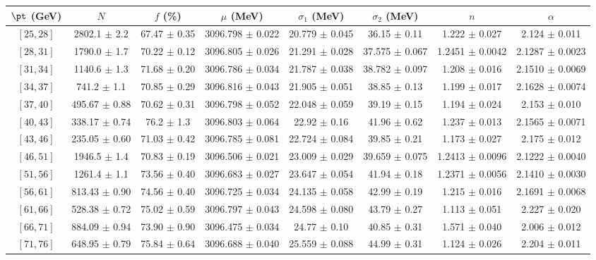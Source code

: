 \begin{tabular}{c||c|c|c|c|c|c|c}
$\pt$ (GeV) & $N$ & $f$ (\%) & $\mu$ (MeV) & $\sigma_1$ (MeV) & $\sigma_2$ (MeV) & $n$ & $\alpha$ \\
\hline
$[25, 28]$ & 2802.1 $\pm$ 2.2 & 67.47 $\pm$ 0.35 & 3096.798 $\pm$ 0.022 & 20.779 $\pm$ 0.045 & 36.15 $\pm$ 0.11 & 1.222 $\pm$ 0.027 & 2.124 $\pm$ 0.011\\
$[28, 31]$ & 1790.0 $\pm$ 1.7 & 70.22 $\pm$ 0.12 & 3096.805 $\pm$ 0.026 & 21.291 $\pm$ 0.028 & 37.575 $\pm$ 0.067 & 1.2451 $\pm$ 0.0042 & 2.1287 $\pm$ 0.0023\\
$[31, 34]$ & 1140.6 $\pm$ 1.3 & 71.68 $\pm$ 0.20 & 3096.786 $\pm$ 0.034 & 21.787 $\pm$ 0.038 & 38.782 $\pm$ 0.097 & 1.208 $\pm$ 0.016 & 2.1510 $\pm$ 0.0069\\
$[34, 37]$ & 741.2 $\pm$ 1.1 & 70.85 $\pm$ 0.29 & 3096.816 $\pm$ 0.043 & 21.905 $\pm$ 0.051 & 38.85 $\pm$ 0.13 & 1.199 $\pm$ 0.017 & 2.1628 $\pm$ 0.0074\\
$[37, 40]$ & 495.67 $\pm$ 0.88 & 70.62 $\pm$ 0.31 & 3096.798 $\pm$ 0.052 & 22.048 $\pm$ 0.059 & 39.19 $\pm$ 0.15 & 1.194 $\pm$ 0.024 & 2.153 $\pm$ 0.010\\
$[40, 43]$ & 338.17 $\pm$ 0.74 & 76.2 $\pm$ 1.3 & 3096.803 $\pm$ 0.064 & 22.92 $\pm$ 0.16 & 41.96 $\pm$ 0.62 & 1.237 $\pm$ 0.013 & 2.1565 $\pm$ 0.0071\\
$[43, 46]$ & 235.05 $\pm$ 0.60 & 71.03 $\pm$ 0.42 & 3096.785 $\pm$ 0.081 & 22.724 $\pm$ 0.084 & 39.85 $\pm$ 0.21 & 1.173 $\pm$ 0.027 & 2.175 $\pm$ 0.012\\
$[46, 51]$ & 1946.5 $\pm$ 1.4 & 70.83 $\pm$ 0.19 & 3096.506 $\pm$ 0.021 & 23.009 $\pm$ 0.029 & 39.659 $\pm$ 0.075 & 1.2413 $\pm$ 0.0096 & 2.1222 $\pm$ 0.0040\\
$[51, 56]$ & 1261.4 $\pm$ 1.1 & 73.56 $\pm$ 0.40 & 3096.683 $\pm$ 0.027 & 23.647 $\pm$ 0.054 & 41.94 $\pm$ 0.18 & 1.2371 $\pm$ 0.0056 & 2.1410 $\pm$ 0.0030\\
$[56, 61]$ & 813.43 $\pm$ 0.90 & 74.56 $\pm$ 0.40 & 3096.725 $\pm$ 0.034 & 24.135 $\pm$ 0.058 & 42.99 $\pm$ 0.19 & 1.215 $\pm$ 0.016 & 2.1691 $\pm$ 0.0068\\
$[61, 66]$ & 528.38 $\pm$ 0.72 & 75.02 $\pm$ 0.59 & 3096.797 $\pm$ 0.043 & 24.598 $\pm$ 0.080 & 43.79 $\pm$ 0.27 & 1.113 $\pm$ 0.051 & 2.227 $\pm$ 0.020\\
$[66, 71]$ & 884.09 $\pm$ 0.94 & 73.90 $\pm$ 0.90 & 3096.475 $\pm$ 0.034 & 24.77 $\pm$ 0.10 & 40.85 $\pm$ 0.31 & 1.571 $\pm$ 0.040 & 2.006 $\pm$ 0.012\\
$[71, 76]$ & 648.95 $\pm$ 0.79 & 75.84 $\pm$ 0.64 & 3096.688 $\pm$ 0.040 & 25.559 $\pm$ 0.088 & 44.99 $\pm$ 0.31 & 1.124 $\pm$ 0.026 & 2.204 $\pm$ 0.011\\

\end{tabular}
